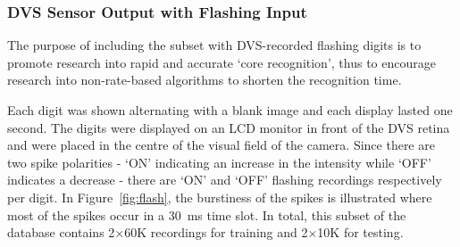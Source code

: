 %
%
%
%


\subsubsection{DVS Sensor Output with Flashing Input}
\label{subsec_flash}
The purpose of including the subset with DVS-recorded flashing digits is to promote research into rapid and accurate `core recognition', thus to encourage research into non-rate-based algorithms to shorten the recognition time.


Each digit was shown alternating with a blank image and each display lasted one second.
The digits were displayed on an LCD monitor in front of the DVS retina~\citep{serrano2013128} and were placed in the centre of the visual field of the camera.
Since there are two spike polarities - `ON' indicating an increase in the intensity while `OFF' indicates a decrease - there are `ON' and `OFF' flashing recordings respectively per digit.
In Figure~\ref{fig:flash}, the burstiness of the spikes is illustrated where most of the spikes occur in a 30~ms time slot. 
In total, this subset of the database contains 2$\times$60K recordings for training and 2$\times$10K for testing.

